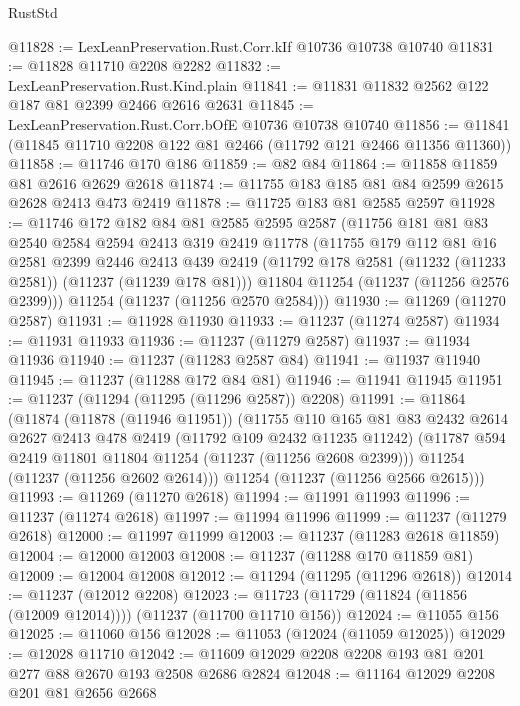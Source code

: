 \begin{lexlean}{RustStd}
\begin{coremodule}
@11828 := LexLeanPreservation.Rust.Corr.kIf @10736 @10738 @10740
@11831 := @11828 @11710 @2208 @2282
@11832 := LexLeanPreservation.Rust.Kind.plain
@11841 := @11831 @11832 @2562 @122 @187 @81 @2399 @2466 @2616 @2631
@11845 := LexLeanPreservation.Rust.Corr.bOfE @10736 @10738 @10740
@11856 := @11841 (@11845 @11710 @2208 @122 @81 @2466 (@11792 @121 @2466 @11356 @11360))
@11858 := @11746 @170 @186
@11859 := @82 @84
@11864 := @11858 @11859 @81 @2616 @2629 @2618
@11874 := @11755 @183 @185 @81 @84 @2599 @2615 @2628 @2413 @473 @2419
@11878 := @11725 @183 @81 @2585 @2597
@11928 := @11746
    @172
    @182
    @84
    @81
    @2585
    @2595
    @2587
    (@11756
      @181
      @81
      @83
      @2540
      @2584
      @2594
      @2413
      @319
      @2419
      @11778
      (@11755
        @179
        @112
        @81
        @16
        @2581
        @2399
        @2446
        @2413
        @439
        @2419
        (@11792 @178 @2581 (@11232 (@11233 @2581)) (@11237 (@11239 @178 @81)))
        @11804
        @11254
        (@11237 (@11256 @2576 @2399)))
      @11254
      (@11237 (@11256 @2570 @2584)))
@11930 := @11269 (@11270 @2587)
@11931 := @11928 @11930
@11933 := @11237 (@11274 @2587)
@11934 := @11931 @11933
@11936 := @11237 (@11279 @2587)
@11937 := @11934 @11936
@11940 := @11237 (@11283 @2587 @84)
@11941 := @11937 @11940
@11945 := @11237 (@11288 @172 @84 @81)
@11946 := @11941 @11945
@11951 := @11237 (@11294 (@11295 (@11296 @2587)) @2208)
@11991 := @11864
    (@11874
      (@11878 (@11946 @11951))
      (@11755
        @110
        @165
        @81
        @83
        @2432
        @2614
        @2627
        @2413
        @478
        @2419
        (@11792 @109 @2432 @11235 @11242)
        (@11787 @594 @2419 @11801 @11804 @11254 (@11237 (@11256 @2608 @2399)))
        @11254
        (@11237 (@11256 @2602 @2614)))
      @11254
      (@11237 (@11256 @2566 @2615)))
@11993 := @11269 (@11270 @2618)
@11994 := @11991 @11993
@11996 := @11237 (@11274 @2618)
@11997 := @11994 @11996
@11999 := @11237 (@11279 @2618)
@12000 := @11997 @11999
@12003 := @11237 (@11283 @2618 @11859)
@12004 := @12000 @12003
@12008 := @11237 (@11288 @170 @11859 @81)
@12009 := @12004 @12008
@12012 := @11294 (@11295 (@11296 @2618))
@12014 := @11237 (@12012 @2208)
@12023 := @11723 (@11729 (@11824 (@11856 (@12009 @12014)))) (@11237 (@11700 @11710 @156))
@12024 := @11055 @156
@12025 := @11060 @156
@12028 := @11053 (@12024 (@11059 @12025))
@12029 := @12028 @11710
@12042 := @11609 @12029 @2208 @2208 @193 @81 @201 @277 @88 @2670 @193 @2508 @2686 @2824
@12048 := @11164 @12029 @2208 @201 @81 @2656 @2668

\end{coremodule}
\end{lexlean}
